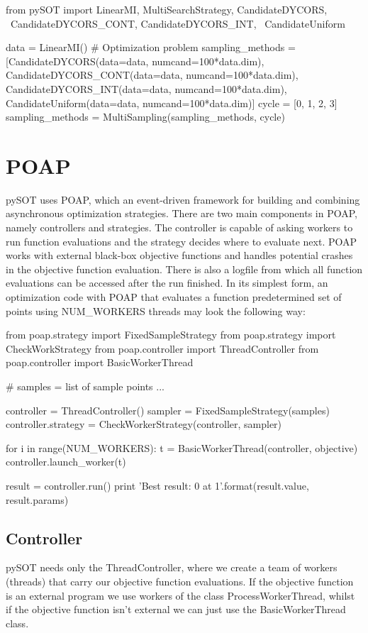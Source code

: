 \documentclass[]{article}
\begin{document}
\begin{python}
from pySOT import LinearMI, MultiSearchStrategy, CandidateDYCORS, \
			  CandidateDYCORS_CONT, CandidateDYCORS_INT, \
			  CandidateUniform

data = LinearMI()  # Optimization problem
sampling_methods = [CandidateDYCORS(data=data, numcand=100*data.dim),
                     CandidateDYCORS_CONT(data=data, numcand=100*data.dim),
                     CandidateDYCORS_INT(data=data, numcand=100*data.dim),
                     CandidateUniform(data=data, numcand=100*data.dim)]
cycle = [0, 1, 2, 3]
sampling_methods = MultiSampling(sampling_methods, cycle)
\end{python}

\section{POAP}
pySOT uses POAP, which an event-driven framework for building and combining asynchronous optimization strategies. There are two main components in POAP, namely controllers and strategies. The controller is  capable of asking workers to run function evaluations and the strategy decides where to evaluate next. POAP works with external black-box objective functions and handles potential crashes in the objective function evaluation. There is also a logfile from which all function evaluations can be accessed after the run finished. In its simplest form, an optimization code with POAP that evaluates a function predetermined set of points using NUM\_WORKERS threads may look the following way:

\begin{python}
from poap.strategy import FixedSampleStrategy
from poap.strategy import CheckWorkStrategy
from poap.controller import ThreadController
from poap.controller import BasicWorkerThread

# samples = list of sample points ...

controller = ThreadController()
sampler = FixedSampleStrategy(samples)
controller.strategy = CheckWorkerStrategy(controller, sampler)

for i in range(NUM_WORKERS):
    t = BasicWorkerThread(controller, objective)
    controller.launch_worker(t)

result = controller.run()
print 'Best result: {0} at {1}'.format(result.value, result.params)
\end{python}

\subsection{Controller} pySOT needs only the ThreadController, where we create a team of workers (threads) that carry our objective function evaluations. If the objective function is an external program we use workers of the class ProcessWorkerThread, whilst if the objective function isn't external we can just use the BasicWorkerThread class.
\end{document}
